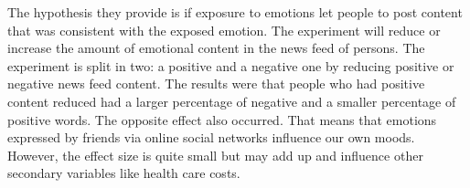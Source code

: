 \documentclass[a4paper,12pt,english]{scrartcl}
\begin{document}
The hypothesis they provide is if exposure to emotions let people to post
content that was consistent with the exposed emotion. The experiment will
reduce or increase the amount of emotional content in the news feed of persons.
The experiment is split in two: a positive and a negative one by reducing
positive or negative news feed content.
The results were that people who had positive content reduced had a larger
percentage of negative and a smaller percentage of positive words. The opposite
effect also occurred. That means that emotions expressed by friends via online
social networks influence our own moods. However, the effect size is quite small
but may add up and influence other secondary variables like health care costs.
\end{document}
